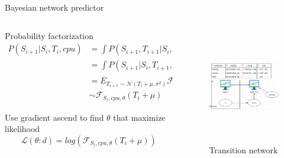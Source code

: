 \documentclass[10pt,xcolor={dvipsnames}, aspectratio=169]{beamer}
\begin{document}
\begin{frame}
{Bayesian network predictor}
	\begin{columns}[T]
	
		\begin{column}{0.6\textwidth}
			\begin{block}
			{Probability factorization}
				\begin{align*}
					P(S_{i+1}|S_{i}, T_{i}, cpu) &= \int{P(S_{i + 1}, T_{i+1}|S_{i}, T_{i}, cpu)dT_{i+1}} \\
												&= \int{P(S_{i+1}|S_{i}, T_{i+1}, cpu)P(T_{i+1}|T_{i})dT_{i+1}} \\
												&= E_{T_{i+1} \sim \mathcal{N}(T_{i} + \mu, \sigma^{2})}\mathcal{F}_{S_{i}, cpu, \theta}(T_{i+1})\\
												&\sim \mathcal{F}_{S_{i}, cpu, \theta}(T_{i} + \mu)
				\end{align*}
			\end{block}
			
			\begin{block}
			{Use gradient ascend to find $\theta$ that maximize likelihood}
				\begin{equation*}
					\mathcal{L}(\theta: d) = log(\mathcal{F}_{S_{i}, cpu, \theta}(T_{i} + \mu))
				\end{equation*}
			\end{block}
		\end{column}

		\hfill		
		
		\begin{column}{0.4\textwidth}
			\begin{figure}
				\centering
				\includegraphics[height=5cm, width=6cm]{images/bayesian_predictor.png}
				\caption{Transition network}
			\end{figure}		
		\end{column}
	\end{columns}
\end{frame}
\end{document}
